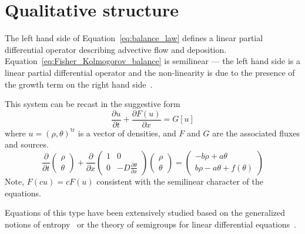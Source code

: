 \documentclass[12pt]{amsart}
\begin{document}

\section{Qualitative structure}

The left hand side of Equation~\ref{eq:balance_law} defines a
linear partial differential operator describing advective flow and
deposition.  Equation~\ref{eq:Fisher_Kolmogorov_balance} is
semilinear --- the left hand side is a linear partial differential
operator and the non-linearity is due to the presence of the growth term 
on the right hand side~\cite{RozhdestvenskiiJanenko:1983}.

This system can be recast in the suggestive form
\begin{equation}
\frac{\partial u}{\partial t} + \frac{\partial F(u)}{\partial x} =
G\left[u\right]
\end{equation}
where $u = (\rho, \theta)^{\text{tr}}$ is a vector of densities, and
$F$ and $G$ are the associated fluxes and sources.
\begin{equation}
  \frac{\partial}{\partial t}
  \begin{pmatrix}
    \rho \\
    \theta
  \end{pmatrix}
  +
  \frac{\partial}{\partial x}
  \begin{pmatrix}
    1 & 0 \\
    0 & - D\frac{\partial\theta}{\partial x}
  \end{pmatrix}
  \begin{pmatrix}
    \rho \\
    \theta
  \end{pmatrix}
  =
  \begin{pmatrix}
    -b\rho + a\theta\\
    b\rho - a\theta + f(\theta)
  \end{pmatrix}
  \label{eq:densities_fluxes_sources}
\end{equation}
Note, $F(cu) = cF(u)$ consistent with the semilinear character of the
equations.

Equations of this type have been extensively studied based on the
generalized notions of
entropy~\cite{Lax:1957,FriedrichsLax:1971,BoillatRuggeri:1997,Yong:2008}
or the theory of semigroups for linear differential
equations~\cite{Segal:1963,OharuTakahashi:1989,Miyadera:1992,CazenaveHaraux:1998,Bellini-MoranteMcBride:1998,KawashimaYong:2004,KobayashiMatsumotoTanaka:2007}.
\end{document}
